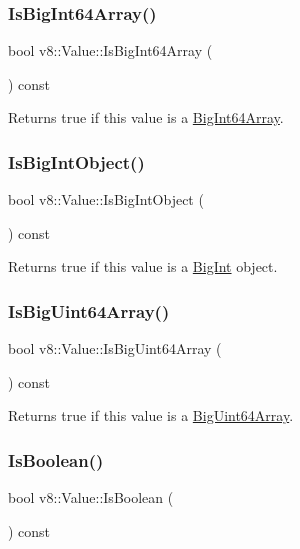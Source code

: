 \subsubsection{\texorpdfstring{Is\+Big\+Int64\+Array()}{IsBigInt64Array()}}
{\footnotesize\ttfamily bool v8\+::\+Value\+::\+Is\+Big\+Int64\+Array (\begin{DoxyParamCaption}{ }\end{DoxyParamCaption}) const}

Returns true if this value is a \mbox{\hyperlink{classv8_1_1BigInt64Array}{Big\+Int64\+Array}}. \mbox{\label{classv8_1_1Value_a33927dad98e669f53f2fed83d68a24a6}} 
\subsubsection{\texorpdfstring{Is\+Big\+Int\+Object()}{IsBigIntObject()}}
{\footnotesize\ttfamily bool v8\+::\+Value\+::\+Is\+Big\+Int\+Object (\begin{DoxyParamCaption}{ }\end{DoxyParamCaption}) const}

Returns true if this value is a \mbox{\hyperlink{classv8_1_1BigInt}{Big\+Int}} object. \mbox{\label{classv8_1_1Value_a8a65d3cc71eebd50fa5cdc02fa2198f0}} 
\subsubsection{\texorpdfstring{Is\+Big\+Uint64\+Array()}{IsBigUint64Array()}}
{\footnotesize\ttfamily bool v8\+::\+Value\+::\+Is\+Big\+Uint64\+Array (\begin{DoxyParamCaption}{ }\end{DoxyParamCaption}) const}

Returns true if this value is a \mbox{\hyperlink{classv8_1_1BigUint64Array}{Big\+Uint64\+Array}}. \mbox{\label{classv8_1_1Value_a7ab7130b87a1fbcced76268353fae00b}} 
\subsubsection{\texorpdfstring{Is\+Boolean()}{IsBoolean()}}
{\footnotesize\ttfamily bool v8\+::\+Value\+::\+Is\+Boolean (\begin{DoxyParamCaption}{ }\end{DoxyParamCaption}) const}

